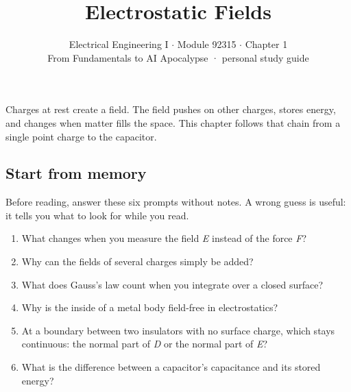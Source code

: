 \documentclass[11pt]{article}
\title{\sffamily\bfseries\color{FAUblue}Electrostatic Fields}
\author{Electrical Engineering I \ensuremath{\cdot} Module 92315 \ensuremath{\cdot} Chapter 1\\[2pt]\small From Fundamentals to AI Apocalypse · personal study guide}
\date{}
\begin{document}
\maketitle
\begingroup\footnotesize\setlength{\parskip}{0pt}\tableofcontents\endgroup
\clearpage

{\large Charges at rest create a field. The field pushes on other charges, stores energy, and changes when matter fills the space. This chapter follows that chain from a single point charge to the capacitor.}


\begin{keepsection}
\section{Start from memory}

Before reading, answer these six prompts without notes. A wrong guess is useful: it tells you what to look for while you read.

\begin{enumerate}
\item What changes when you measure the field \textit{E} instead of the force \textit{F}?
\item Why can the fields of several charges simply be added?
\item What does Gauss’s law count when you integrate over a closed surface?
\item Why is the inside of a metal body field-free in electrostatics?
\item At a boundary between two insulators with no surface charge, which stays continuous: the normal part of \textit{D} or the normal part of \textit{E}?
\item What is the difference between a capacitor’s capacitance and its stored energy?
\end{enumerate}

\end{keepsection}
\end{document}
